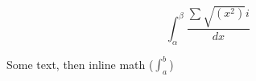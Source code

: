 \documentclass{article}
\begin{document}
	\begin{equation}
		\int_{\alpha}^{\beta}{\frac{\sum{\sqrt{\left(x^2\right)}i}}{dx}\ }
	\end{equation}















	Some text, then inline math ($\int_a^b$)
\end{document}

